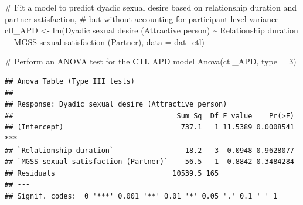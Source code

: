 \documentclass[
  bookmarksnumbered]{article}
\newenvironment{Shaded}{\begin{snugshade}}{\end{snugshade}}
\newcommand{\AttributeTok}[1]{\textcolor[rgb]{0.80,0.80,0.80}{#1}}
\newcommand{\CommentTok}[1]{\textcolor[rgb]{0.50,0.62,0.50}{#1}}
\newcommand{\DecValTok}[1]{\textcolor[rgb]{0.86,0.86,0.80}{#1}}
\newcommand{\FunctionTok}[1]{\textcolor[rgb]{0.94,0.94,0.56}{#1}}
\newcommand{\NormalTok}[1]{\textcolor[rgb]{0.80,0.80,0.80}{#1}}
\newcommand{\OtherTok}[1]{\textcolor[rgb]{0.94,0.94,0.56}{#1}}
\newcommand{\SpecialCharTok}[1]{\textcolor[rgb]{0.86,0.64,0.64}{#1}}
\newcommand{\StringTok}[1]{\textcolor[rgb]{0.80,0.58,0.58}{#1}}
\begin{document}
\begin{Shaded}
\begin{Highlighting}[]
\CommentTok{\# Fit a model to predict dyadic sexual desire based on relationship duration and partner satisfaction,}
\CommentTok{\# but without accounting for participant{-}level variance}
\NormalTok{ctl\_APD }\OtherTok{\textless{}{-}} \FunctionTok{lm}\NormalTok{(}\StringTok{\textasciigrave{}}\AttributeTok{Dyadic sexual desire (Attractive person)}\StringTok{\textasciigrave{}} \SpecialCharTok{\textasciitilde{}} 
                \StringTok{\textasciigrave{}}\AttributeTok{Relationship duration}\StringTok{\textasciigrave{}} \SpecialCharTok{+} \StringTok{\textasciigrave{}}\AttributeTok{MGSS sexual satisfaction (Partner)}\StringTok{\textasciigrave{}}\NormalTok{,}
              \AttributeTok{data =}\NormalTok{ dat\_ctl)}

\CommentTok{\# Perform an ANOVA test for the CTL APD model}
\FunctionTok{Anova}\NormalTok{(ctl\_APD, }\AttributeTok{type =} \DecValTok{3}\NormalTok{)}
\end{Highlighting}
\end{Shaded}

\begin{verbatim}
## Anova Table (Type III tests)
## 
## Response: Dyadic sexual desire (Attractive person)
##                                       Sum Sq  Df F value    Pr(>F)    
## (Intercept)                            737.1   1 11.5389 0.0008541 ***
## `Relationship duration`                 18.2   3  0.0948 0.9628077    
## `MGSS sexual satisfaction (Partner)`    56.5   1  0.8842 0.3484284    
## Residuals                            10539.5 165                      
## ---
## Signif. codes:  0 '***' 0.001 '**' 0.01 '*' 0.05 '.' 0.1 ' ' 1
\end{verbatim}
\end{document}

